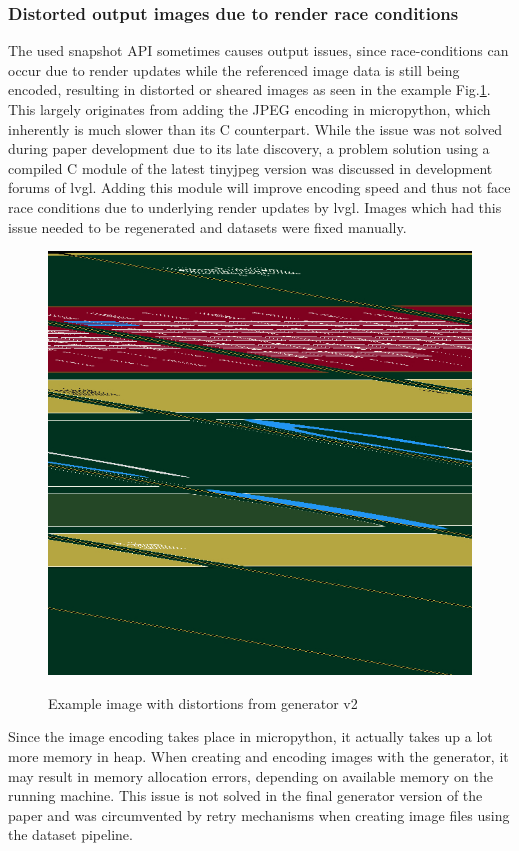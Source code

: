 \documentclass[Bachelor, BIC, english, fhCitStyle, IEEE]{BASE/twbook} %
\newcommand{\nocontentsline}[3]{}
\newcommand{\hidsubsubsection}[1]{\bgroup\let\addcontentsline=\nocontentsline\subsubsection{#1}\egroup}
\begin{document}
\clearpage
\hidsubsubsection{Distorted output images due to render race conditions}
The used snapshot API sometimes causes output issues, since race-conditions can occur due to render updates while the referenced image data is still being encoded, resulting in distorted or sheared images as seen in the example Fig.\ref{fig:genv2distortedexample}. This largely originates from adding the JPEG encoding in micropython, which inherently is much slower than its C counterpart. While the issue was not solved during paper development due to its late discovery, a problem solution using a compiled C module of the latest tinyjpeg version was discussed in development forums of \ac{lvgl}. Adding this module will improve encoding speed and thus not face race conditions due to underlying render updates by \ac{lvgl}. Images which had this issue needed to be regenerated and datasets were fixed manually.
\begin{figure}
    \caption{Example image with distortions from generator v2}
    \centering
    \includegraphics[height=0.45\textheight]{distorted_image_example.jpg}
    \label{fig:genv2distortedexample}
\end{figure}
\hidsubsubsection{Memory allocation errors}
Since the image encoding takes place in micropython, it actually takes up a lot more memory in heap. When creating and encoding images with the generator, it may result in memory allocation errors, depending on available memory on the running machine. This issue is not solved in the final generator version of the paper and was circumvented by retry mechanisms when creating image files using the dataset pipeline.
\newpage
\end{document}
